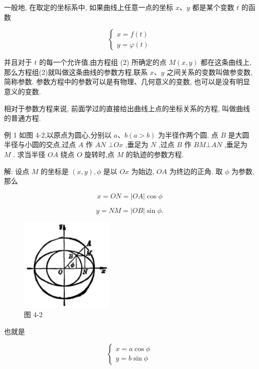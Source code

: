 \documentclass[lang=cn,newtx,10pt,scheme=chinese]{elegantbook}
\begin{document}
一般地, 在取定的坐标系中, 如果曲线上任意一点的坐标 \(x\text{、}y\) 都是某个变数 \(t\) 的函数

\[
  \left\{ \begin{array}{l} x = f\left( t\right) \\ y = \varphi \left( t\right) \end{array}\right. \tag{2}
\]

并且对于 \(t\) 的每一个允许值,由方程组 (2) 所确定的点 \(M\left( {x,y}\right)\) 都在这条曲线上,那么方程组(2)就叫做这条曲线的参数方程,联系 \(x\text{、}y\) 之间关系的变数叫做参变数,简称参数. 参数方程中的参数可以是有物理、几何意义的变数, 也可以是没有明显意义的变数.

相对于参数方程来说, 前面学过的直接给出曲线上点的坐标关系的方程, 叫做曲线的普通方程.

例 1 如图 4-2,以原点为圆心,分别以 \(a\text{、}b\left( {a > b}\right)\) 为半径作两个圆. 点 \(B\) 是大圆半径与小圆的交点,过点 \(A\) 作 \({AN}\) \(\bot {Ox}\) ,垂足为 \(N\) ,过点 \(B\) 作 \({BM} \bot {AN}\) ,垂足为 \(M\) . 求当半径 \({OA}\) 绕点 \(O\) 旋转时,点 \(M\) 的轨迹的参数方程.

解: 设点 \(M\) 的坐标是 \(\left( {x,y}\right) ,\phi\) 是以 \({Ox}\) 为始边, \({OA}\) 为终边的正角. 取 \(\phi\) 为参数,那么

\[
  x = {ON} = \left| {OA}\right| \cos \phi
\]

\[
  y = {NM} = \left| {OB}\right| \sin \phi .
\]

\begin{figure}[h]
  \centering
  \includegraphics[max width=0.4\textwidth]{images/01912cc2-ffb6-728e-9ae7-b113ff05c64b_163_552087.jpg}
  \caption{图 4-2}
\end{figure}



也就是

\[
  \left\{ \begin{array}{l} x = a\cos \phi \\ y = b\sin \phi \end{array}\right.
\]
\end{document}
